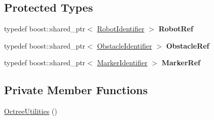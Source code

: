 \subsection*{Protected Types}
\begin{CompactItemize}
\item 
\hypertarget{class_octree_utilities_defea31b9e1f51132deebe397c4afaf8}{
typedef boost::shared\_\-ptr$<$ \hyperlink{class_robot_identifier}{RobotIdentifier} $>$ \textbf{RobotRef}}
\label{class_octree_utilities_defea31b9e1f51132deebe397c4afaf8}

\item 
\hypertarget{class_octree_utilities_1efe8125ddbeae47ee06fae5fb15ef6a}{
typedef boost::shared\_\-ptr$<$ \hyperlink{class_obstacle_identifier}{ObstacleIdentifier} $>$ \textbf{ObstacleRef}}
\label{class_octree_utilities_1efe8125ddbeae47ee06fae5fb15ef6a}

\item 
\hypertarget{class_octree_utilities_f0ab4d17f6e4cbf89169d2db408f5987}{
typedef boost::shared\_\-ptr$<$ \hyperlink{class_marker_identifier}{MarkerIdentifier} $>$ \textbf{MarkerRef}}
\label{class_octree_utilities_f0ab4d17f6e4cbf89169d2db408f5987}

\end{CompactItemize}
\subsection*{Private Member Functions}
\begin{CompactItemize}
\item 
\hyperlink{class_octree_utilities_f202963d538bef3e5513d51dc118705d}{OctreeUtilities} ()
\end{CompactItemize}
